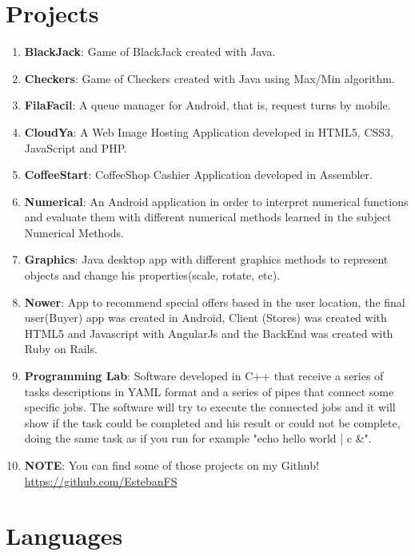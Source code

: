 \documentclass[a4paper,10pt]{article} %
\begin{document}
\section{Projects}
\begin{enumerate}
\item \textbf{BlackJack}: Game of BlackJack created with Java.
\item \textbf{Checkers}:  Game of Checkers created with Java using Max/Min algorithm.
\item \textbf{FilaFacil}: A queue manager for Android, that is, request turns by mobile.
\item \textbf{CloudYa}: A Web Image Hosting Application developed in HTML5, CSS3, JavaScript and PHP.
\item \textbf{CoffeeStart}: CoffeeShop Cashier Application developed in Assembler.
\item \textbf{Numerical}: An Android application in order to interpret numerical functions and evaluate them with different numerical methods learned in the subject Numerical Methods.
\item \textbf{Graphics}: Java desktop app with different graphics methods to represent objects and change his properties(scale, rotate, etc).
\item \textbf{Nower}: App to recommend special offers based in the user location, the final user(Buyer) app was created in Android, Client (Stores) was created with HTML5 and Javascript with AngularJs and the BackEnd was created with Ruby on Rails.
\item \textbf{Programming Lab}: Software developed in C++ that receive a series of tasks descriptions in YAML format and a series of pipes that connect some specific jobs. The software will try to execute the connected jobs and it will show if the task could be completed and his result or could not be complete, doing the same task as if you run for example "echo hello world | c \&".
\item \textbf{NOTE}: You can find some of those projects on my Github! \href{https://github.com/EstebanFS}{https://github.com/EstebanFS}
\end{enumerate}



\section{Languages}
\end{document}
